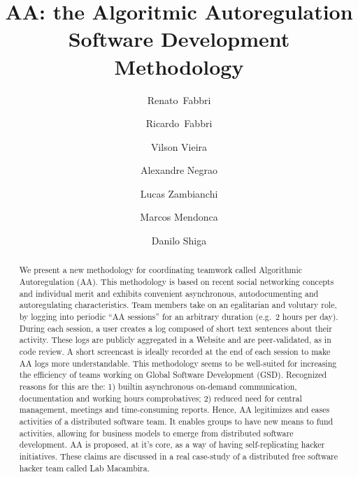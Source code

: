 \title{
    AA: the Algoritmic Autoregulation Software Development Methodology
}

\author{%
Renato~Fabbri \and Ricardo~Fabbri \and Vilson Vieira \and Alexandre Negrao \and Lucas Zambianchi
\and Marcos Mendonca \and Danilo Shiga
}

\maketitle

\begin{abstract}
We present a new methodology for coordinating
teamwork called Algorithmic Autoregulation (AA). This methodology is based on recent social networking concepts and individual merit and exhibits convenient asynchronous, autodocumenting and autoregulating characteristics. Team
members take on an egalitarian and volutary role, by logging into
periodic ``AA sessions'' for an arbitrary duration (e.g.\ 2 hours per day).
During each session, a user creates a log composed of short text sentences
about their activity. These logs are
publicly aggregated in a Website and are peer-validated, as in code
review. A short screencast is ideally recorded at the end of each session to make
AA logs more understandable. This methodology seems to be well-suited for
increasing the efficiency of teams working on
Global Software Development (GSD). Recognized reasons for this are
the: 1) builtin asynchronous
on-demand communication, documentation and working hours comprobatives;
2) reduced need for central management,
meetings and time-consuming reports. Hence, AA
legitimizes and eases activities of a distributed software team.  It
enables groups to have new means to fund activities,
allowing for business models to emerge from
distributed software development. AA is proposed,
at it's core, as a way of having self-replicating hacker initiatives. These claims are
discussed in a real case-study of a distributed free software
hacker team called Lab Macambira.
\end{abstract}

